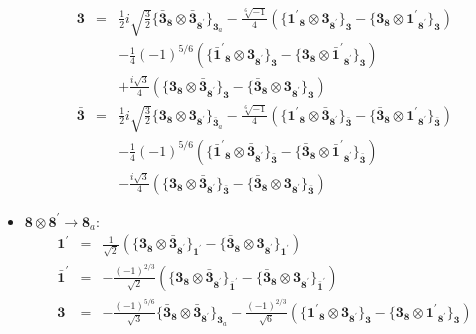 \documentclass[english]{article}
\newcommand{\subcg}[3]{\big\{ {#1}\otimes{#2}\big\}^{}_{#3}}
\newcommand{\rep}[1]{\mathbf{#1}}
\begin{document}
\begin{itemize}
\begin{eqnarray*}
\\
\rep{3} &=& \frac{1}{2} i \sqrt{\frac{3}{2}}\subcg{\rep{\bar{3}}_{\rep{8}}}{\rep{\bar{3}}_{\rep{8^{\prime}}}}{\rep{3}_{a}}-\frac{\sqrt[6]{-1}}{4}\left(\subcg{\rep{1^{\prime}}_{\rep{8}}}{\rep{3}_{\rep{8^{\prime}}}}{\rep{3}}-\subcg{\rep{3}_{\rep{8}}}{\rep{1^{\prime}}_{\rep{8^{\prime}}}}{\rep{3}}\right) \\ 
 & & -\frac{1}{4} (-1)^{5/6}\left(\subcg{\rep{\bar{1}^{\prime}}_{\rep{8}}}{\rep{3}_{\rep{8^{\prime}}}}{\rep{3}}-\subcg{\rep{3}_{\rep{8}}}{\rep{\bar{1}^{\prime}}_{\rep{8^{\prime}}}}{\rep{3}}\right) \\ 
 & & +\frac{i \sqrt{3}}{4}\left(\subcg{\rep{3}_{\rep{8}}}{\rep{\bar{3}}_{\rep{8^{\prime}}}}{\rep{3}}-\subcg{\rep{\bar{3}}_{\rep{8}}}{\rep{3}_{\rep{8^{\prime}}}}{\rep{3}}\right)
\\
\rep{\bar{3}} &=& \frac{1}{2} i \sqrt{\frac{3}{2}}\subcg{\rep{3}_{\rep{8}}}{\rep{3}_{\rep{8^{\prime}}}}{\rep{\bar{3}}_{a}}-\frac{\sqrt[6]{-1}}{4}\left(\subcg{\rep{1^{\prime}}_{\rep{8}}}{\rep{\bar{3}}_{\rep{8^{\prime}}}}{\rep{\bar{3}}}-\subcg{\rep{\bar{3}}_{\rep{8}}}{\rep{1^{\prime}}_{\rep{8^{\prime}}}}{\rep{\bar{3}}}\right) \\ 
 & & -\frac{1}{4} (-1)^{5/6}\left(\subcg{\rep{\bar{1}^{\prime}}_{\rep{8}}}{\rep{\bar{3}}_{\rep{8^{\prime}}}}{\rep{\bar{3}}}-\subcg{\rep{\bar{3}}_{\rep{8}}}{\rep{\bar{1}^{\prime}}_{\rep{8^{\prime}}}}{\rep{\bar{3}}}\right) \\ 
 & & -\frac{i \sqrt{3}}{4}\left(\subcg{\rep{3}_{\rep{8}}}{\rep{\bar{3}}_{\rep{8^{\prime}}}}{\rep{\bar{3}}}-\subcg{\rep{\bar{3}}_{\rep{8}}}{\rep{3}_{\rep{8^{\prime}}}}{\rep{\bar{3}}}\right)
\end{eqnarray*}
\item $\rep{8}\otimes\rep{8^{\prime}}\to\rep{8}_{a}$:
\begin{eqnarray*}
\rep{1^{\prime}} &=& \frac{1}{\sqrt{2}}\left(\subcg{\rep{3}_{\rep{8}}}{\rep{\bar{3}}_{\rep{8^{\prime}}}}{\rep{1^{\prime}}}-\subcg{\rep{\bar{3}}_{\rep{8}}}{\rep{3}_{\rep{8^{\prime}}}}{\rep{1^{\prime}}}\right)
\\
\rep{\bar{1}^{\prime}} &=& -\frac{(-1)^{2/3}}{\sqrt{2}}\left(\subcg{\rep{3}_{\rep{8}}}{\rep{\bar{3}}_{\rep{8^{\prime}}}}{\rep{\bar{1}^{\prime}}}-\subcg{\rep{\bar{3}}_{\rep{8}}}{\rep{3}_{\rep{8^{\prime}}}}{\rep{\bar{1}^{\prime}}}\right)
\\
\rep{3} &=& -\frac{(-1)^{5/6}}{\sqrt{3}}\subcg{\rep{\bar{3}}_{\rep{8}}}{\rep{\bar{3}}_{\rep{8^{\prime}}}}{\rep{3}_{a}}-\frac{(-1)^{2/3}}{\sqrt{6}}\left(\subcg{\rep{1^{\prime}}_{\rep{8}}}{\rep{3}_{\rep{8^{\prime}}}}{\rep{3}}-\subcg{\rep{3}_{\rep{8}}}{\rep{1^{\prime}}_{\rep{8^{\prime}}}}{\rep{3}}\right) \\ 

\end{eqnarray*}
\end{itemize}
\end{document}
